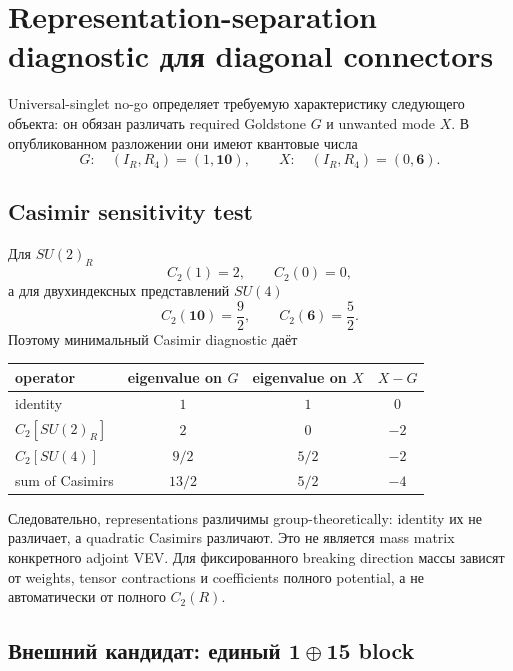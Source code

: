 \chapter{Representation-separation diagnostic для diagonal connectors}

Universal-singlet no-go определяет требуемую характеристику следующего
объекта: он обязан различать required Goldstone \(G\) и unwanted mode
\(X\). В опубликованном разложении они имеют квантовые числа
\begin{equation}
 G:\quad (I_R,R_4)=(1,\mathbf{10}),
 \qquad
 X:\quad (I_R,R_4)=(0,\mathbf6).
\end{equation}

\section{Casimir sensitivity test}

Для \(SU(2)_R\)
\begin{equation}
 C_2(1)=2,
 \qquad C_2(0)=0,
\end{equation}
а для двухиндексных представлений \(SU(4)\)
\begin{equation}
 C_2(\mathbf{10})=\frac92,
 \qquad
 C_2(\mathbf6)=\frac52.
\end{equation}
Поэтому минимальный Casimir diagnostic даёт
\begin{center}
\begin{tabular}{lccc}
\toprule
operator & eigenvalue on \(G\) & eigenvalue on \(X\) & \(X-G\) \\
\midrule
identity & \(1\) & \(1\) & \(0\) \\
\(C_2[SU(2)_R]\) & \(2\) & \(0\) & \(-2\) \\
\(C_2[SU(4)]\) & \(9/2\) & \(5/2\) & \(-2\) \\
sum of Casimirs & \(13/2\) & \(5/2\) & \(-4\) \\
\bottomrule
\end{tabular}
\end{center}

Следовательно, representations различимы group-theoretically: identity их
не различает, а quadratic Casimirs различают. Это не является mass matrix
конкретного adjoint VEV. Для фиксированного breaking direction массы зависят
от weights, tensor contractions и coefficients полного potential, а не
автоматически от полного \(C_2(R)\).

\section{\texorpdfstring{Внешний кандидат: единый \(\mathbf1\oplus\mathbf{15}\) block}{Внешний кандидат: единый 1+15 block}}

